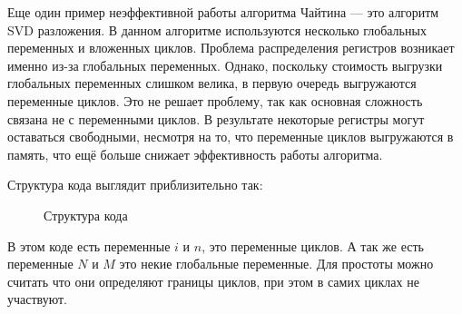 Еще один пример неэффективной работы алгоритма Чайтина — это алгоритм SVD разложения.
В данном алгоритме используются несколько глобальных переменных и вложенных циклов.
Проблема распределения регистров возникает именно из-за глобальных переменных.  
Однако, поскольку стоимость выгрузки глобальных переменных слишком велика, в первую очередь выгружаются переменные циклов.
Это не решает проблему, так как основная сложность связана не с переменными циклов. 
В результате некоторые регистры могут оставаться свободными, несмотря на то, что переменные циклов выгружаются в память, что ещё больше снижает эффективность работы алгоритма.

Структура кода выглядит приблизительно так:

\begin{figure}[H]
    \centering
    \caption{Структура кода}
    \label{fig:structure}
\end{figure}

В этом коде есть переменные $i$ и $n$, это переменные циклов. А так же есть переменные $N$ и $M$ это
некие глобальные переменные. Для простоты можно считать что они определяют границы циклов, при этом
в самих циклах не участвуют.

